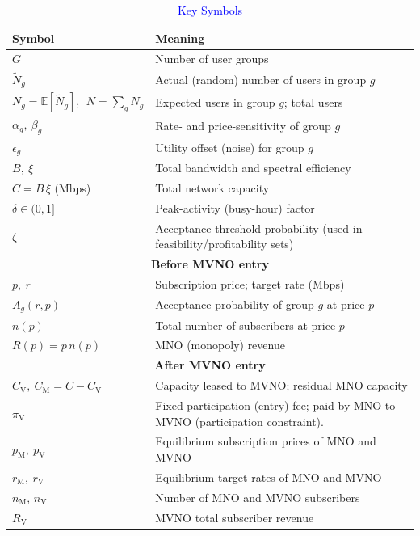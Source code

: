 \documentclass[12pt, draftclsnofoot, onecolumn]{IEEEtran}
\begin{document}
	
	
	
	\begin{table}[t]
		\scriptsize
		\centering
		\caption{\textcolor{blue}{Key Symbols}}
		\label{tab:parameters}
		\begin{tabularx}{0.98\linewidth}{|l|X|}
			\hline
			\textbf{Symbol} & \textbf{Meaning} \\ \hline
			$G$ & Number of user groups \\ 
			$\tilde N_g$ & Actual (random) number of users in group $g$ \\ 
			$N_g=\mathbb{E}[\tilde N_g],\ \ N=\sum_g N_g$ & Expected users in group $g$; total users \\ 
			$\alpha_g,\ \beta_g$ & Rate- and price-sensitivity of group $g$ \\ 
			$\epsilon_g$ & Utility offset (noise) for group $g$ \\
			$B,\ \xi$ & Total bandwidth and spectral efficiency \\
			$C=B\,\xi$ (Mbps) & Total network capacity \\
			$\delta\in(0,1]$ & Peak-activity (busy-hour) factor \\ 
			$\zeta$ & Acceptance-threshold probability (used in feasibility/profitability sets) \\
			\hline
			\multicolumn{2}{|c|}{\textbf{Before MVNO entry}} \\ \hline
			$p,\ r$ & Subscription price; target rate (Mbps) \\
			$A_g(r,p)$ & Acceptance probability of group $g$ at price $p$ \\
			$n(p)$ & Total number of subscribers at price $p$ \\
			$R(p)=p\,n(p)$ & MNO (monopoly) revenue \\
			\hline
			\multicolumn{2}{|c|}{\textbf{After MVNO entry}} \\ \hline
			$C_{\mathrm V},\ C_{\mathrm M}=C-C_{\mathrm V}$ & Capacity leased to MVNO; residual MNO capacity \\
			$\pi_{\mathrm V}$ & Fixed participation (entry) fee; paid by MNO to MVNO (participation constraint). \\
			$p_{\mathrm M},\ p_{\mathrm V}$ & Equilibrium subscription prices of MNO and MVNO \\
			$r_{\mathrm M},\ r_{\mathrm V}$ & Equilibrium target rates of MNO and MVNO \\
			$n_{\mathrm M}$, $n_{\mathrm V}$ & Number of MNO and MVNO subscribers \\
			$R_{\mathrm V}$ & MVNO total subscriber revenue \\

\end{tabularx}
\end{table}
\end{document}
